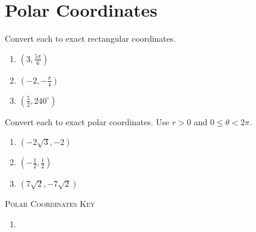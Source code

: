 \chapter{Polar Coordinates}

Convert each to exact rectangular coordinates.
\begin{enumerate}
	\item $\left(3, \frac{5\pi}{6}\right)$
    \item $\left(-2, -\frac{\pi}{4}\right)$
    \item $\left(\frac{5}{2}, 240^\circ\right)$
\end{enumerate}

Convert each to exact polar coordinates. Use $r > 0$ and $0 \leq \theta < 2\pi$.
\begin{enumerate}
	\item $\left(-2\sqrt{3}, -2\right)$
    \item $\left(-\frac{1}{2}, \frac{1}{2}\right)$
    \item $\left(7\sqrt{2}, -7\sqrt{2}\right)$
\end{enumerate}

\newpage

\textsc{Polar Coordinates Key}

\begin{enumerate}
	\item 
\end{enumerate}